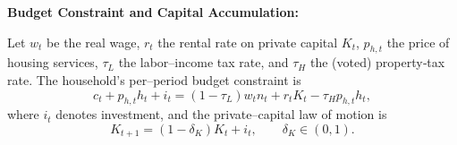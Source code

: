 \vskip 0.3cm

{\bf Budget Constraint and Capital Accumulation:}

Let $w_t$ be the real wage, $r_t$ the rental rate on private capital $K_t$, $p_{h,t}$ the price of housing services, $\tau_L$ the labor–income tax rate, and $\tau_H$ the (voted) property‐tax rate. The household’s per–period budget constraint is
\begin{equation}
 c_t + p_{h,t}h_t + i_t = (1-\tau_L)w_t n_t + r_tK_t - \tau_H p_{h,t}h_t,\label{eq:hhbudget}
\end{equation}
where $i_t$ denotes investment, and the private–capital law of motion is
\begin{equation}
K_{t+1}=(1-\delta_K)K_t + i_t, \qquad \delta_K\in(0,1).
\end{equation}


